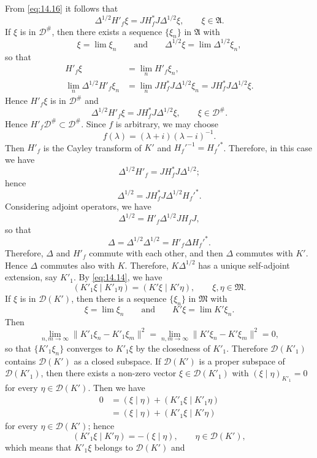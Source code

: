\documentclass[12pt,b5paper,twoside]{article}
\theoremstyle{takesaki}
\numberwithin{equation}{section}
\begin{document}
From \eqref{eq:14.16} it follows that
\[
 \Delta^{1/2}H'_f\xi=JH_f^*J\Delta^{1/2}\xi,
 \qquad \xi\in\mathfrak A.
\]
If $\xi$ is in $\mathcal D^{\#}$, then there exists a sequence
$\{\xi_n\}$ in $\mathfrak A$ with
\[
 \xi=\lim\xi_n
 \qquad\text{and}\qquad
 \Delta^{1/2}\xi=\lim\Delta^{1/2}\xi_n,
\]
so that
\begin{align*}
 H'_f\xi&=\lim_nH'_f\xi_n,\\
 \lim_n\Delta^{1/2}H'_f\xi_n
 &=\lim_nJH_f^*J\Delta^{1/2}\xi_n
  =JH_f^*J\Delta^{1/2}\xi.
\end{align*}
Hence $H'_f\xi$ is in $\mathcal D^{\#}$ and
\[
 \Delta^{1/2}H'_f\xi=JH_f^*J\Delta^{1/2}\xi,
 \qquad \xi\in\mathcal D^{\#}.
\]
Hence $H'_f\mathcal D^{\#}\subset\mathcal D^{\#}$.  Since $f$ is
arbitrary, we may choose
\[
 f(\lambda)=(\lambda+i)(\lambda-i)^{-1}.
\]
Then $H'_f$ is the Cayley transform of $K'$ and
$H_f'^{-1}=H_f'^*$.  Therefore, in this case we have
\[
 \Delta^{1/2}H'_f=JH_f^*J\Delta^{1/2};
\]
hence
\[
 \Delta^{1/2}=JH_f^*J\Delta^{1/2}H_f'^*.
\]
Considering adjoint operators, we have
\[
 \Delta^{1/2}=H'_f\Delta^{1/2}JH_fJ,
\]
so that
\[
 \Delta=\Delta^{1/2}\Delta^{1/2}=H'_f\Delta H_f'^*.
\]
Therefore, $\Delta$ and $H'_f$ commute with each other, and then
$\Delta$ commutes with $K'$.  Hence $\Delta$ commutes also with $K$.
Therefore, $K\Delta^{1/2}$ has a unique self-adjoint extension, say
$K'_1$.  By \eqref{eq:14.14}, we have
\[
 (K'_1\xi\mid K'_1\eta)=(K'\xi\mid K'\eta),
 \qquad \xi,\eta\in\mathfrak M.
\]
If $\xi$ is in $\mathcal D(K')$, then there is a sequence
$\{\xi_n\}$ in $\mathfrak M$ with
\[
 \xi=\lim\xi_n
 \qquad\text{and}\qquad
 K'\xi=\lim K'\xi_n.
\]
Then
\[
 \lim_{n,m\to\infty}\|K'_1\xi_n-K'_1\xi_m\|^2
 =\lim_{n,m\to\infty}\|K'\xi_n-K'\xi_m\|^2=0,
\]
so that $\{K'_1\xi_n\}$ converges to $K'_1\xi$ by the closedness of
$K'_1$.  Therefore $\mathcal D(K'_1)$ contains $\mathcal D(K')$ as a
closed subspace.  If $\mathcal D(K')$ is a proper subspace of
$\mathcal D(K'_1)$, then there exists a non-zero vector
$\xi\in\mathcal D(K'_1)$ with
$(\xi\mid\eta)_{K'_1}=0$ for every $\eta\in\mathcal D(K')$.  Then we
have
\begin{align*}
 0&=(\xi\mid\eta)+(K'_1\xi\mid K'_1\eta)\\
  &=(\xi\mid\eta)+(K'_1\xi\mid K'\eta)
\end{align*}
for every $\eta\in\mathcal D(K')$; hence
\[
 (K'_1\xi\mid K'\eta)=-(\xi\mid\eta),
 \qquad \eta\in\mathcal D(K'),
\]
which means that $K'_1\xi$ belongs to $\mathcal D(K')$ and
\end{document}
